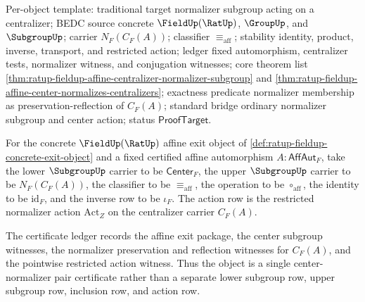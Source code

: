 Per-object template: traditional target normalizer subgroup acting on a
centralizer; BEDC source concrete $\FieldUp(\RatUp)$, $\GroupUp$, and
$\SubgroupUp$; carrier $N_F(C_F(A))$; classifier $\equiv_{\mathrm{aff}}$;
stability identity, product, inverse, transport, and restricted action; ledger
fixed automorphism, centralizer tests, normalizer witness, and conjugation
witnesses; core theorem list
\autoref{thm:ratup-fieldup-affine-centralizer-normalizer-subgroup} and
\autoref{thm:ratup-fieldup-affine-center-normalizes-centralizers}; exactness
predicate normalizer membership as preservation-reflection of $C_F(A)$;
standard bridge ordinary normalizer subgroup and center action; status
$\mathsf{ProofTarget}$.

\begin{definition}
\label{def:ratup-fieldup-affine-center-normalizer-subgroupup-pair}
For the concrete $\FieldUp(\RatUp)$ affine exit object of
\autoref{def:ratup-fieldup-concrete-exit-object} and a fixed certified affine
automorphism $A:\mathsf{AffAut}_F$, take the lower $\SubgroupUp$ carrier to be
$\mathsf{Center}_F$, the upper $\SubgroupUp$ carrier to be $N_F(C_F(A))$, the
classifier to be $\equiv_{\mathrm{aff}}$, the operation to be
$\circ_{\mathrm{aff}}$, the identity to be $\mathrm{id}_F$, and the inverse row
to be $\iota_F$. The action row is the restricted normalizer action
$\mathrm{Act}_Z$ on the centralizer carrier $C_F(A)$.

The certificate ledger records the affine exit package, the center subgroup
witnesses, the normalizer preservation and reflection witnesses for $C_F(A)$,
and the pointwise restricted action witness. Thus the object is a single
center-normalizer pair certificate rather than a separate lower subgroup row,
upper subgroup row, inclusion row, and action row.
\end{definition}


